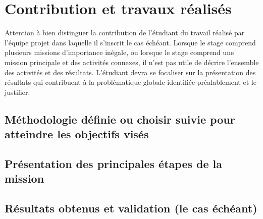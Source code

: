 \chapter{Contribution et travaux réalisés}
\label{sec:contrib}

Attention à bien distinguer la contribution de l’étudiant du travail réalisé par l’équipe projet dans laquelle il s’inscrit le cas échéant.
Lorsque le stage comprend plusieurs missions d’importance inégale, ou lorsque le stage comprend une mission principale et des activités connexes, il n’est pas utile de décrire l’ensemble des activités et des résultats. L’étudiant devra se focaliser sur la présentation des résultats qui contribuent à la problématique globale identifiée préalablement et le justifier.


\section{Méthodologie définie ou choisir suivie pour atteindre les objectifs visés}
    \lipsum[1-2]
    
\section{Présentation des principales étapes de la mission}
    \lipsum[1-2]
    
\section{Résultats obtenus et validation (le cas échéant)}
    \lipsum[1-2]
    
